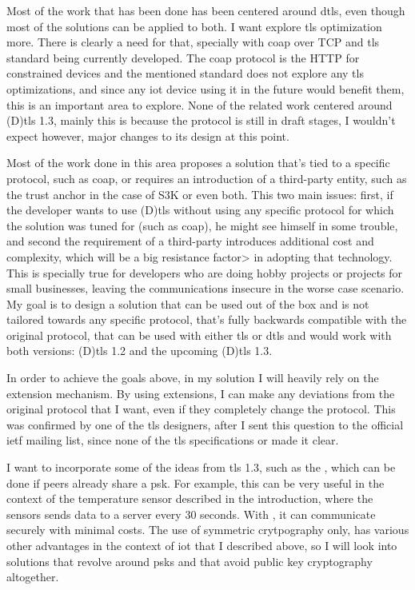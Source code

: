 \documentclass{llncs}
\begin{document}
Most of the work that has been done has been centered around \gls{dtls},
even though most of the solutions can be applied to both.
I want explore \gls{tls} optimization more. There is clearly a need for that, specially with \gls{coap} over
TCP and \gls{tls} standard being currently developed. The \gls{coap} protocol is the HTTP
for constrained devices and the mentioned standard does not explore any \gls{tls}
optimizations, and since any \gls{iot} device using it in the future would benefit
them, this is an important area to explore. None of the related work centered around
(D)\gls{tls} 1.3, mainly this is because the protocol is still in draft stages, I wouldn't expect
however, major changes to its design at this point.

Most of the work done in this area proposes a solution that's tied to a
specific protocol, such as \gls{coap}, or requires an introduction of a third-party
entity, such as the trust anchor in the case of S3K\cite{S3KScala62:online} or
even both. This two main issues: first, if the developer wants to use (D)\gls{tls}
without using any specific protocol for which the solution was tuned for (such as \gls{coap}),
he might see himself in some trouble, and second the requirement of a third-party
introduces additional cost and complexity, which will be a big resistance factor>
in adopting that technology. This is specially true for developers who are doing
hobby projects or projects for small businesses, leaving the communications insecure
in the worse case scenario. My goal is to design a solution that can be used out
of the box and is not tailored towards any specific protocol, that's fully backwards
compatible with the original protocol, that can be used with either \gls{tls}
or \gls{dtls} and would work with both versions: (D)\gls{tls} 1.2 and the upcoming
(D)\gls{tls} 1.3.

In order to achieve the goals above, in my solution I will heavily rely on the extension
mechanism. By using extensions, I can make any deviations from the original protocol
that I want, even if they completely change the protocol. This was confirmed by
one of the \gls{tls} designers, after I sent this question to the official
\gls{ietf} mailing list\cite{ReTLSTLS31:online}, since none of the \gls{tls}
specifications or  made it clear.

I want to incorporate some of the ideas from \gls{tls} 1.3, such as the
, which can be done if peers already share a \gls{psk}.
For example, this can be very useful in the context of the temperature sensor
described in the introduction, where the sensors sends data to a server every
30 seconds. With , it can communicate securely with minimal costs.
The use of symmetric crytpography only, has various other advantages in the context
of \gls{iot} that I described above, so I will look into solutions that revolve around
\gls{psk}s and that avoid public key cryptography altogether.
\end{document}
